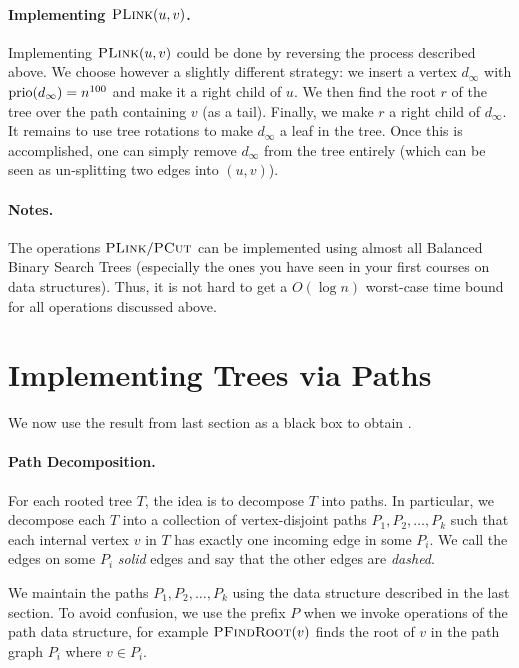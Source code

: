 \paragraph{Implementing $\textsc{PLink}(u,v)$.} Implementing $\textsc{PLink}(u,v)$ could be done by reversing the process described above. We choose however a slightly different strategy: we insert a vertex $d_{\infty}$ with $\operatorname{prio}(d_{\infty}) = n^{100}$ and make it a right child of $u$. We then find the root $r$ of the tree over the path containing $v$ (as a tail). Finally, we make $r$ a right child of $d_{\infty}$. It remains to use tree rotations to make $d_{\infty}$ a leaf in the tree.  Once this is accomplished, one can simply remove $d_{\infty}$ from the tree entirely (which can be seen as un-splitting two edges into $(u,v)$).  

\paragraph{Notes.} The operations $\textsc{PLink}/ \textsc{PCut}$ can be implemented using almost all Balanced Binary Search Trees (especially the ones you have seen in your first courses on data structures). Thus, it is not hard to get a $O(\log n)$ worst-case time bound for all operations discussed above.

\section{Implementing Trees via Paths}

We now use the result from last section as a black box to obtain .

\paragraph{Path Decomposition.} For each rooted tree $T$, the idea is to decompose $T$ into paths. In particular, we decompose each $T$ into a collection of vertex-disjoint paths $P_1, P_2, \dots, P_k$ such that each internal vertex $v$ in $T$ has exactly one incoming edge in some $P_i$. We call the edges on some $P_i$  \emph{solid} edges and say that the other edges are \emph{dashed}. 

We maintain the paths $P_1, P_2, \dots, P_k$ using the data structure described in the last section. To avoid confusion, we use the prefix $P$ when we invoke operations of the path data structure, for example $\textsc{PFindRoot}(v)$ finds the root of $v$ in the path graph $P_i$ where $v \in P_i$.

